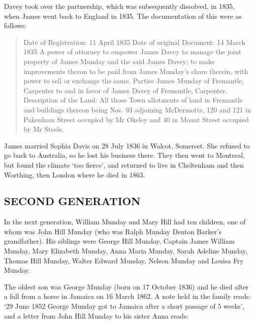 Davey took over the partnership, which was subsequently dissolved, in 1835, when James went back to England in 1835. The documentation of this were as follows:
\begin{quotation}
Date of Registration: 11 April 1835
Date of original Document: 14 March 1835
A power of attorney to empower James Davey to manage the joint property of James Munday and the said James Davey; to make improvements theron to be paid from James Munday's share therein, with power to sell or exchange the same. Parties James Munday of Fremantle, Carpenter to and in favor of James Davey of Fremantle, Carpenter.
Description of the Land:
All those Town allotments of land in Fremantle and buildings thereon being
Nos. 93 adjoining McDermotts,
120 and 121 in Pakenham Street occupied by Mr Okeley and
40 in Mouat Street occupied by Mr Steele.
\end{quotation}

James married Sophia Davis on 28 July 1836 in	Walcot, Somerset.  She refused to go back to Australia, so he lost his business there. They then went to Montreal, but found the climate `too fierce', and returned to live in Cheltenham and then Worthing, then London where he died in 1863.

\subsection{SECOND GENERATION}

In the next generation, William Munday and Mary Hill had ten children, one of whom was John Hill Munday (who was Ralph Munday Denton Barker's grandfather). His siblings were George Hill Munday, Captain James William Munday, Mary Elizabeth Munday, Anna Maria Munday, Sarah Adeline Munday, Thomas Hill Munday, Walter Edward Munday, Nelson Munday and Louisa Fry Munday. 

The oldest son was George Munday (born on 17 October 1836) and he died after a fall from a horse in Jamaica on 16 March 1862. A note held in the family reads: `29 June 1852 George Munday got to Jamaica after a short passage of 5 weeks', and a letter from John Hill Munday to his sister Anna reads:

